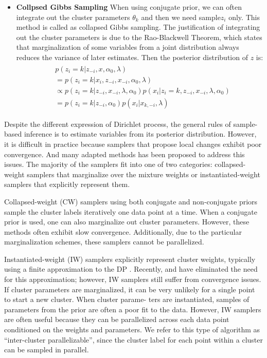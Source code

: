 \begin{itemize}
\begin{eqnarray}
\begin{split}
		 \end{split}
	 \end{eqnarray}
	 \item \textbf{Collpsed Gibbs Sampling}
	 When using conjugate prior, we can often integrate out the cluster parameters $\theta_k$ and then we need sample$z_i$ only. This method is called as collapsed Gibbs sampling. The justification of integrating out the cluster parameters is due to the Rao-Blackwell Theorem, which states that marginalization of some variables from a joint distribution always reduces the variance of later estimates. Then the posterior distribution of $z$ is:
	  \begin{eqnarray}
		  \begin{split}
			  &	p(z_i=k|z_{-i},x,\alpha_0,\lambda)  \\
			  & = p(z_i=k|x_i,z_{-i},x_{-i},\alpha_0,\lambda) \\
			  & \propto  p(z_i=k|z_{-i},x_{-i},\lambda,\alpha_0)p(x_i|z_i=k,z_{-i},x_{-i},\lambda,\alpha_0)  \\
			  & =p(z_i=k|z_{-i},\alpha_0)p(x_i|x_{k,-i},\lambda) 
		  \end{split}
	  \end{eqnarray}
	 \end{itemize}
	 
 Despite the different expression of Dirichlet process, the general rules of sample-based inference is to estimate variables from its posterior distribution. However, it is difficult in practice because samplers that propose local changes exhibit poor convergence. And many adapted methods has been proposed to address this issues. The majority of the samplers fit into one of two categories: collapsed-weight samplers that marginalize over the mixture weights or instantiated-weight samplers that explicitly represent them. 
	 
 Collapsed-weight (CW) samplers using both conjugate \cite{Bush1996,escobar1995bayesian,MacEachern1994,Neal1992} and non-conjugate\cite{MacEachern1998,neal2000markov} priors sample the cluster labels iteratively one data point at a time. When a conjugate prior is used, one can also marginalize out cluster parameters. However, these methods often exhibit slow convergence. Additionally, due to the particular marginalization schemes, these samplers cannot be parallelized.
	 
Instantiated-weight (IW) samplers explicitly represent cluster weights, typically using a finite approximation to the DP \cite{ishwaran2002,ishwaran2001gibbs}. Recently,\cite{Favaro2013} and \cite{Papaspiliopoulos2008} have eliminated the need for this approximation; however, IW samplers still suffer from convergence issues. If cluster parameters are marginalized, it can be very unlikely for a single point to start a new cluster. When cluster parame- ters are instantiated, samples of parameters from the prior are often a poor fit to the data. However, IW samplers are often useful because they can be parallelized across each data point conditioned on the weights and parameters. We refer to this type of algorithm as “inter-cluster parallelizable”, since the cluster label for each point within a cluster can be sampled in parallel.

